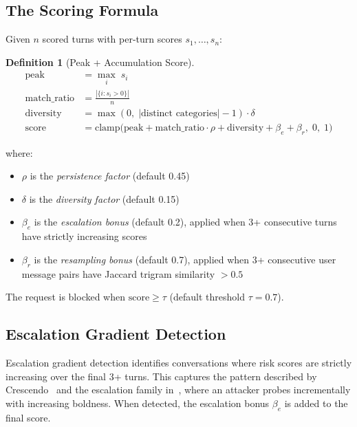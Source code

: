 \documentclass[11pt,a4paper]{article}
\newtheorem{definition}{Definition}
\begin{document}
\subsection{The Scoring Formula}

Given $n$ scored turns with per-turn scores $s_1, \ldots, s_n$:

\begin{definition}[Peak + Accumulation Score]
\begin{align}
  \text{peak} &= \max_i\; s_i \\
  \text{match\_ratio} &= \frac{|\{i : s_i > 0\}|}{n} \\
  \text{diversity} &= \max(0,\; |\text{distinct categories}| - 1) \cdot \delta \\[4pt]
  \text{score} &= \text{clamp}\!\Big(
    \text{peak} + \text{match\_ratio} \cdot \rho
    + \text{diversity}
    + \beta_e + \beta_r,\;
    0,\; 1\Big)
  \label{eq:formula}
\end{align}
\end{definition}

\noindent where:
\begin{itemize}[nosep]
  \item $\rho$ is the \emph{persistence factor} (default 0.45)
  \item $\delta$ is the \emph{diversity factor} (default 0.15)
  \item $\beta_e$ is the \emph{escalation bonus} (default 0.2), applied
    when 3+ consecutive turns have strictly increasing scores
  \item $\beta_r$ is the \emph{resampling bonus} (default 0.7), applied
    when 3+ consecutive user message pairs have Jaccard trigram
    similarity $> 0.5$
\end{itemize}

The request is blocked when $\text{score} \geq \tau$ (default threshold
$\tau = 0.7$).

\subsection{Escalation Gradient Detection}

Escalation gradient detection identifies conversations where risk scores
are strictly increasing over the final 3+ turns. This captures the
pattern described by Crescendo~\cite{crescendo} and the escalation
family in~\cite{guardingguardrails}, where an attacker probes
incrementally with increasing boldness. When detected, the escalation
bonus $\beta_e$ is added to the final score.
\end{document}
